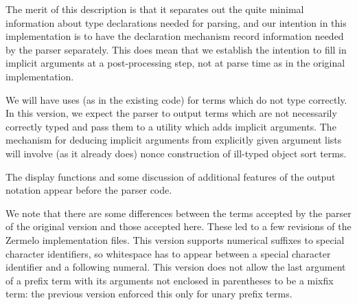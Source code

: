 \documentclass[12pt]{article}
\begin{document}

The merit of this description is that it separates out the quite minimal information about type declarations needed for parsing, and our intention in this implementation is to have the declaration mechanism record information needed by the  parser separately.  This does mean that we establish the intention to fill in implicit arguments at a post-processing step, not at parse time as in the original implementation.

We will have uses (as in the existing code) for terms which do not type correctly.  In this version, we expect the parser to output terms which are not necessarily correctly typed
and pass them to a utility which adds implicit arguments.  The mechanism for deducing implicit arguments from explicitly given argument lists will involve (as it already does)
nonce construction of ill-typed object sort terms.

The display functions and some discussion of additional features of the output notation appear before the parser code.

We note that there are some differences between the terms accepted by the parser of the original version and those accepted here.  These led to a few revisions of the Zermelo implementation files.  This version supports numerical suffixes to special character identifiers, so whitespace has to appear between a special character identifier and a following numeral.  This version does not allow the last argument of a prefix term with its arguments not enclosed in parentheses to be a mixfix term:  the previous version enforced this only for unary prefix terms.
\end{document}
